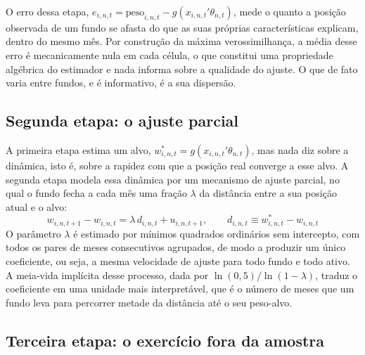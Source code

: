 \documentclass[12pt,a4paper]{article}
\begin{document}
O erro dessa etapa, $e_{i,n,t} = \text{peso}_{i,n,t} - g(x_{i,n,t}'\theta_{n,t})$, mede o
quanto a posição observada de um fundo se afasta do que as suas próprias características
explicam, dentro do mesmo mês. Por construção da máxima verossimilhança, a média desse erro
é mecanicamente nula em cada célula, o que constitui uma propriedade algébrica do
estimador e nada informa sobre a qualidade do ajuste. O que de fato varia entre fundos, e é informativo, é a
sua dispersão.

\subsection{Segunda etapa: o ajuste parcial}

A primeira etapa estima um alvo, $w^*_{i,n,t} = g(x_{i,n,t}'\theta_{n,t})$, mas nada diz
sobre a dinâmica, isto é, sobre a rapidez com que a posição real converge a esse alvo. A
segunda etapa modela essa dinâmica por um mecanismo de ajuste parcial, no qual o fundo fecha
a cada mês uma fração $\lambda$ da distância entre a sua posição atual e o alvo:
\begin{equation}
w_{i,n,t+1} - w_{i,n,t} = \lambda\, d_{i,n,t} + u_{i,n,t+1}, \qquad
d_{i,n,t} \equiv w^*_{i,n,t} - w_{i,n,t}
\label{eq:pa}
\end{equation}
O parâmetro $\lambda$ é estimado por mínimos quadrados ordinários sem intercepto, com todos
os pares de meses consecutivos agrupados, de modo a produzir um único coeficiente, ou seja,
a mesma velocidade de ajuste para todo fundo e todo ativo. A meia-vida implícita desse
processo, dada por $\ln(0{,}5)/\ln(1-\lambda)$, traduz o coeficiente em uma unidade mais
interpretável, que é o número de meses que um fundo leva para percorrer metade da distância
até o seu peso-alvo.

\subsection{Terceira etapa: o exercício fora da amostra}
\end{document}
